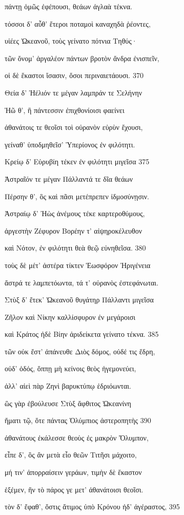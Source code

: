 πάντῃ ὁμῶς ἐφέπουσι, θεάων ἀγλαὰ τέκνα. 

τόσσοι δ' αὖθ' ἕτεροι ποταμοὶ καναχηδὰ ῥέοντες,

υἱέες Ὠκεανοῦ, τοὺς γείνατο πότνια Τηθύς· 

τῶν ὄνομ' ἀργαλέον πάντων βροτὸν ἄνδρα ἐνισπεῖν, 

οἱ δὲ ἕκαστοι ἴσασιν, ὅσοι περιναιετάουσι. \num{370} 

Θεία δ' Ἠέλιόν τε μέγαν λαμπράν τε Σελήνην 

Ἠῶ θ', ἣ πάντεσσιν ἐπιχθονίοισι φαείνει

ἀθανάτοις τε θεοῖσι τοὶ οὐρανὸν εὐρὺν ἔχουσι,

γείναθ' ὑποδμηθεῖσ' Ὑπερίονος ἐν φιλότητι. 

Κρείῳ δ' Εὐρυβίη τέκεν ἐν φιλότητι μιγεῖσα \num{375} 

Ἀστραῖόν τε μέγαν Πάλλαντά τε δῖα θεάων

Πέρσην θ', ὃς καὶ πᾶσι μετέπρεπεν ἰδμοσύνῃσιν.

Ἀστραίῳ δ' Ἠὼς ἀνέμους τέκε καρτεροθύμους,

ἀργεστὴν Ζέφυρον Βορέην τ' αἰψηροκέλευθον 

καὶ Νότον, ἐν φιλότητι θεὰ θεῷ εὐνηθεῖσα. \num{380}

τοὺς δὲ μέτ' ἀστέρα τίκτεν Ἑωσφόρον Ἠριγένεια

ἄστρά τε λαμπετόωντα, τά τ' οὐρανὸς ἐστεφάνωται. 

Στὺξ δ' ἔτεκ' Ὠκεανοῦ θυγάτηρ Πάλλαντι μιγεῖσα

Ζῆλον καὶ Νίκην καλλίσφυρον ἐν μεγάροισι 

καὶ Κράτος ἠδὲ Βίην ἀριδείκετα γείνατο τέκνα. \num{385} 

τῶν οὐκ ἔστ' ἀπάνευθε Διὸς δόμος, οὐδέ τις ἕδρη,

οὐδ' ὁδός, ὅππῃ μὴ κείνοις θεὸς ἡγεμονεύει,

ἀλλ' αἰεὶ πὰρ Ζηνὶ βαρυκτύπῳ ἑδριόωνται.

ὣς γὰρ ἐβούλευσε Στὺξ ἄφθιτος Ὠκεανίνη

ἤματι τῷ, ὅτε πάντας Ὀλύμπιος ἀστεροπητὴς \num{390}

ἀθανάτους ἐκάλεσσε θεοὺς ἐς μακρὸν Ὄλυμπον,

εἶπε δ', ὃς ἂν μετὰ εἷο θεῶν Τιτῆσι μάχοιτο,

μή τιν' ἀπορραίσειν γεράων, τιμὴν δὲ ἕκαστον

ἑξέμεν, ἣν τὸ πάρος γε μετ' ἀθανάτοισι θεοῖσι.

τὸν δ' ἔφαθ', ὅστις ἄτιμος ὑπὸ Κρόνου ἠδ' ἀγέραστος, \num{395}

